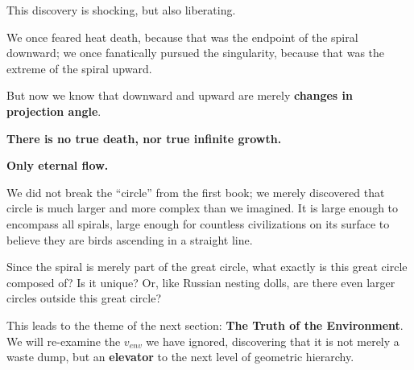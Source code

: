 This discovery is shocking, but also liberating.

We once feared heat death, because that was the endpoint of the spiral downward; we once fanatically pursued the singularity, because that was the extreme of the spiral upward.

But now we know that downward and upward are merely \textbf{changes in projection angle}.

\textbf{There is no true death, nor true infinite growth.}

\textbf{Only eternal flow.}

We did not break the ``circle'' from the first book; we merely discovered that circle is much larger and more complex than we imagined. It is large enough to encompass all spirals, large enough for countless civilizations on its surface to believe they are birds ascending in a straight line.

Since the spiral is merely part of the great circle, what exactly is this great circle composed of? Is it unique? Or, like Russian nesting dolls, are there even larger circles outside this great circle?

This leads to the theme of the next section: \textbf{The Truth of the Environment}. We will re-examine the $v_{env}$ we have ignored, discovering that it is not merely a waste dump, but an \textbf{elevator} to the next level of geometric hierarchy.

